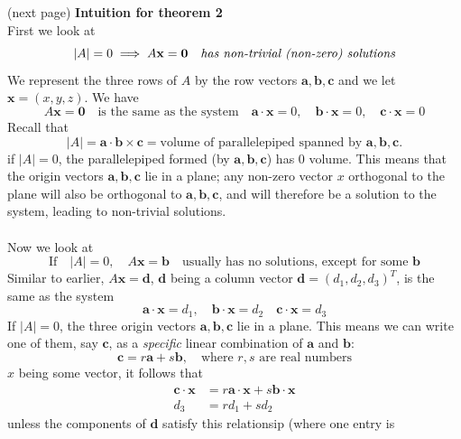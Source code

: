 \documentclass{report}
\begin{document}
(next page)
\newpage
\noindent\textbf{Intuition for theorem 2}\\
First we look at
\begin{equation*}
|A|=0\implies A\mathbf{x=0}\quad\text{\textit{has non-trivial (non-zero) solutions}}
\end{equation*}
We represent the three rows of $A$ by the row vectors $\mathbf{a,b,c}$ and we let 
$\mathbf{x}=(x,y,z)$. We have
\begin{equation*}
A\mathbf{x=0}\quad\text{is the same as the system}\quad
\mathbf{a\cdot x}=0,\quad\mathbf{b\cdot x}=0,\quad\mathbf{c\cdot x}=0
\end{equation*}
Recall that
\begin{equation*}
|A|=\mathbf{a\cdot b\times c}=\text{volume of parallelepiped spanned by $\mathbf{a,b,c}$.}
\end{equation*}
if $|A|=0$, the parallelepiped formed (by $\mathbf{a,b,c}$) has 0 volume. 
This means that the origin vectors $\mathbf{a,b,c}$ lie in a plane; any non-zero 
vector $x$ orthogonal to the plane will also be orthogonal to $\mathbf{a,b,c}$, 
and will therefore be a solution to the system, leading to non-trivial solutions.\\
\vspace{1mm}\\
Now we look at 
\begin{equation*}
\text{If}\quad|A|=0,\quad A\mathbf{x=b}\quad\text{usually has no solutions, 
except for some }\mathbf{b}
\end{equation*}
Similar to earlier, $A\mathbf{x=d}$, $\mathbf{d}$ being a column vector
$\mathbf{d}=(d_1,d_2,d_3)^T$, is the same as the system
\begin{equation*}
\mathbf{a\cdot x}=d_1,\quad\mathbf{b\cdot x}=d_2\quad\mathbf{c\cdot x}=d_3
\end{equation*}
If $|A|=0$, the three origin vectors $\mathbf{a,b,c}$ lie in a plane. This means we 
can write one of them, say $\mathbf{c}$, as a \textit{specific} linear combination 
of $\mathbf{a}$ and $\mathbf{b}$:
\begin{equation*}
\mathbf{c}=r\mathbf{a}+s\mathbf{b},\quad\text{where $r,s$ are real numbers}
\end{equation*}
$x$ being some vector, it follows that
\begin{align*}
\mathbf{c\cdot x}&=r\mathbf{a\cdot x}+s\mathbf{b\cdot x}\\
d_3&=rd_1+sd_2
\end{align*}
unless the components of $\mathbf{d}$ satisfy this relationsip (where one entry is 
\end{document}
